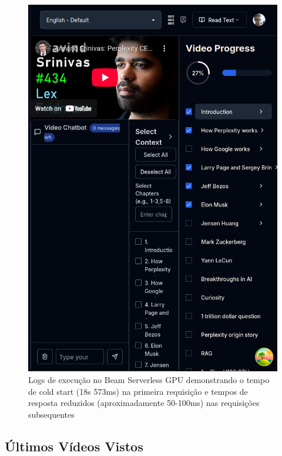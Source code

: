 \documentclass[tcc,capa]{texufpel}
\begin{document}
\begin{figure}[H]
  \centering
  \includegraphics[width=\textwidth,height=0.45\textheight,keepaspectratio]{exemplo-slides/graphics/images/table of contents.png}
  \caption{Logs de execução no Beam Serverless GPU demonstrando o tempo de cold start (18s 573ms) na primeira requisição e tempos de resposta reduzidos (aproximadamente 50-100ms) nas requisições subsequentes}
  \label{fig:Average_encryption_throughput}
\end{figure}




\subsection{Últimos Vídeos Vistos}
\end{document}
